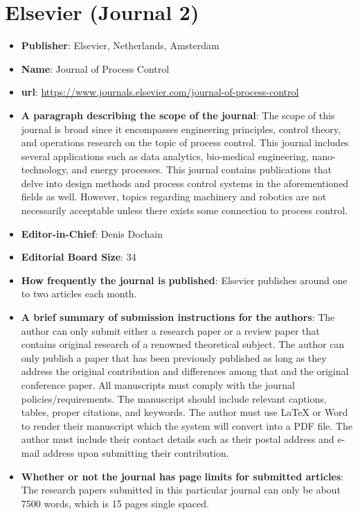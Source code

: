 \documentclass[11pt,twocolumn]{article}
\begin{document}
\section{Elsevier (Journal 2)}
\begin{itemize}
  \item{\bf{Publisher}}: Elsevier, Netherlands, Amsterdam 
  \item {\bf{Name}}: Journal of Process Control
  \item{\bf{url}}: \url{https://www.journals.elsevier.com/journal-of-process-control}
  \item {\bf{A paragraph describing the scope of the journal}}: The scope of this journal is broad since it encompasses engineering principles, control theory, and operations research on the topic of process control. This journal includes several applications such as data analytics, bio-medical engineering, nano-technology, and energy processes. This journal contains publications that delve into design methods and process control systems in the aforementioned fields as well. However, topics regarding machinery and robotics are not necessarily acceptable unless there exists some connection to process control. 
  \item{\bf{Editor-in-Chief}}: Denis Dochain
  \item{\bf{Editorial Board Size}}: 34
  \item{\bf{How frequently the  journal is}}
  {\bf{published}}: Elsevier publishes around one to two articles each month.
  \item{\bf{A brief summary of submission instructions for the authors}}: The author can only submit either a research paper or a review paper that contains original research of a renowned theoretical subject. The author can only publish a paper that has been previously published as long as they address the original contribution and differences among that and the original conference paper. All manuscripts must comply with the journal policies/requirements. The manuscript should include relevant captions, tables, proper citations, and keywords. The author must use LaTeX or Word to render their manuscript which the system will convert into a PDF file. The author must include their contact details such as their postal address and e-mail address upon submitting their contribution.  
  \item{\bf{Whether or not the journal has page}}
  {\bf{limits for submitted articles}}: 
  The research papers submitted in this particular journal can only be about 7500 words, which is 15 pages single spaced.

\end{itemize}
\end{document}
